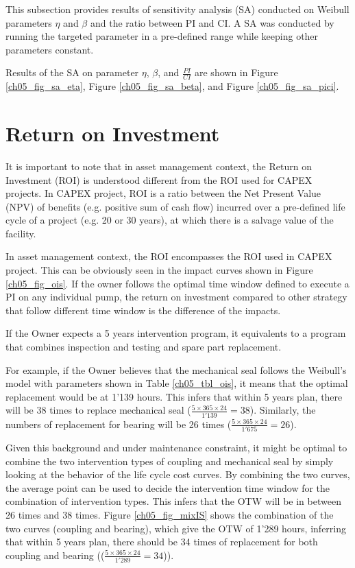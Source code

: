 This subsection provides results of sensitivity analysis (SA) conducted on Weibull parameters $\eta$ and $\beta$ and the ratio between PI and CI. A SA was conducted by running the targeted parameter in a pre-defined range while keeping other parameters constant.

Results of the SA on parameter $\eta$, $\beta$, and $\frac{PI}{CI}$ are shown in Figure \ref{ch05_fig_sa_eta}, Figure \ref{ch05_fig_sa_beta}, and Figure \ref{ch05_fig_sa_pici}.








\section{Return on Investment}
It is important to note that in asset management context, the Return on Investment (ROI) is understood different from the ROI used for CAPEX projects. In CAPEX project, ROI is a ratio between the Net Present Value (NPV) of benefits (e.g. positive sum of cash flow) incurred over a pre-defined life cycle of a project (e.g. 20 or 30 years), at which there is a salvage value of the facility.

In asset management context, the ROI encompasses the ROI used in CAPEX project. This can be obviously seen in the impact curves shown in Figure \ref{ch05_fig_ois}. If the owner follows the optimal time window defined to execute a PI on any individual pump, the return on investment compared to other strategy that follow different time window is the difference of the impacts.

If the Owner expects a 5 years intervention program, it equivalents to a program that combines inspection and testing and spare part replacement.

For example, if the Owner believes that the mechanical seal follows the Weibull's model with parameters shown in Table \ref{ch05_tbl_ois}, it means that the optimal replacement would be at 1'139 hours. This infers that within 5 years plan, there will be 38 times to replace mechanical seal ($\frac{5 \times 365 \times 24}{1'139}=38$). Similarly, the numbers of replacement for bearing will be 26 times ($\frac{5 \times 365 \times 24}{1'675}=26$).

Given this background and under maintenance constraint, it might be optimal to combine the two intervention types of coupling and mechanical seal by simply looking at the behavior of the life cycle cost curves. By combining the two curves, the average point can be used to decide the intervention time window for the combination of intervention types. This infers that the OTW will be in between 26 times and 38 times. Figure \ref{ch05_fig_mixIS} shows the combination of the two curves (coupling and bearing), which give the OTW of 1'289 hours, inferring that within 5 years plan, there should be 34 times of replacement for both coupling and bearing (($\frac{5 \times 365 \times 24}{1'289}=34$)).

